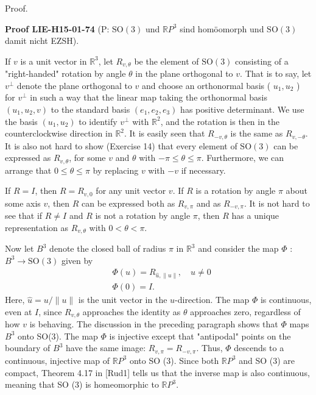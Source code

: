 \documentclass[10pt, letterpaper]{article}
\newcommand{\R}{\mathbb{R}}
\newcommand{\SO}{\mathrm{SO}}
\newcommand{\CustomHeading}[3]{%
  \par\medskip\noindent%
  \textbf{#1 #2} \textnormal{(#3)}.\enskip%
}
\newenvironment{PROOF}[2]{\begin{unitbox}\CustomHeading{Proof}{#1}{#2}}{\end{unitbox}}
\begin{document}
Proof. 


\begin{PROOF}{LIE-H15-01-74}{P: $\SO(3)$ und $\R P^3$ sind homöomorph und $\SO(3)$ damit nicht EZSH}
If $v$ is a unit vector in $\mathbb{R}^{3}$, let $R_{v, \theta}$ be the element of $\mathrm{SO}(3)$ consisting of a "right-handed" rotation by angle $\theta$ in the plane orthogonal to $v$. That is to say, let $v^{\perp}$ denote the plane orthogonal to $v$ and choose an orthonormal basis ( $u_{1}, u_{2}$ ) for $v^{\perp}$ in such a way that the linear map taking the orthonormal basis $\left(u_{1}, u_{2}, v\right)$ to the standard basis $\left(e_{1}, e_{2}, e_{3}\right)$ has positive determinant. We use the basis $\left(u_{1}, u_{2}\right)$ to identify $v^{\perp}$ with $\mathbb{R}^{2}$, and the rotation is then in the counterclockwise direction in $\mathbb{R}^{2}$. It is easily seen that $R_{-v, \theta}$ is the same as $R_{v,-\theta}$. It is also not hard to show (Exercise 14) that every element of $\mathrm{SO}(3)$ can be expressed as $R_{v, \theta}$, for some $v$ and $\theta$ with $-\pi \leq \theta \leq \pi$. Furthermore, we can arrange that $0 \leq \theta \leq \pi$ by replacing $v$ with $-v$ if necessary.

If $R=I$, then $R=R_{v, 0}$ for any unit vector $v$. If $R$ is a rotation by angle $\pi$ about some axis $v$, then $R$ can be expressed both as $R_{v, \pi}$ and as $R_{-v, \pi}$. It is not hard to see that if $R \neq I$ and $R$ is not a rotation by angle $\pi$, then $R$ has a unique representation as $R_{v, \theta}$ with $0<\theta<\pi$.

Now let $B^{3}$ denote the closed ball of radius $\pi$ in $\mathbb{R}^{3}$ and consider the map $\Phi$ : $B^{3} \rightarrow \mathrm{SO}(3)$ given by
$$
\begin{aligned}
& \Phi(u)=R_{\hat{u},\|u\|}, \quad u \neq 0 \\
& \Phi(0)=I .
\end{aligned}
$$
Here, $\hat{u}=u /\|u\|$ is the unit vector in the $u$-direction. The map $\Phi$ is continuous, even at $I$, since $R_{v, \theta}$ approaches the identity as $\theta$ approaches zero, regardless of how $v$ is behaving. The discussion in the preceding paragraph shows that $\Phi$ maps $B^{3}$ onto SO(3). The map $\Phi$ is injective except that "antipodal" points on the boundary of $B^{3}$ have the same image: $R_{v, \pi}=R_{-v, \pi}$. Thus, $\Phi$ descends to a continuous, injective map of $\mathbb{R} P^{3}$ onto SO (3). Since both $\mathbb{R} P^{3}$ and SO (3) are compact, Theorem 4.17 in [Rud1] tells us that the inverse map is also continuous, meaning that SO (3) is homeomorphic to $\mathbb{R} P^{3}$.
\end{PROOF}
\end{document}
